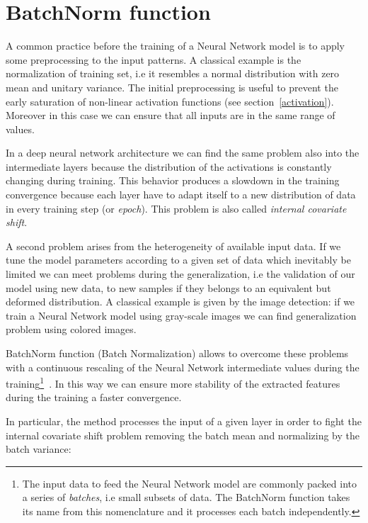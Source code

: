 \documentclass{standalone}
\begin{document}
\section[BatchNorm function]{BatchNorm function}\label{batchnorm}

A common practice before the training of a Neural Network model is to apply some preprocessing to the input patterns.
A classical example is the normalization of training set, i.e it resembles a normal distribution with zero mean and unitary variance.
The initial preprocessing is useful to prevent the early saturation of non-linear activation functions (see section~\ref{activation}).
Moreover in this case we can ensure that all inputs are in the same range of values.

In a deep neural network architecture we can find the same problem also into the intermediate layers because the distribution of the activations is constantly changing during training.
This behavior produces a slowdown in the training convergence because each layer have to adapt itself to a new distribution of data in every training step (or \emph{epoch}).
This problem is also called \emph{internal covariate shift}.

A second problem arises from the heterogeneity of available input data.
If we tune the model parameters according to a given set of data which inevitably be limited we can meet problems during the generalization, i.e the validation of our model using new data, to new samples if they belongs to an equivalent but deformed distribution.
A classical example is given by the image detection: if we train a Neural Network model using gray-scale images we can find generalization problem using colored images.

BatchNorm function (Batch Normalization) allows to overcome these problems with a continuous rescaling of the Neural Network intermediate values during the training\footnote{
  The input data to feed the Neural Network model are commonly packed into a series of \emph{batches}, i.e small subsets of data.
  The BatchNorm function takes its name from this nomenclature and it processes each batch independently.
}~\cite{Sergey2015BatchNorm}.
In this way we can ensure more stability of the extracted features~\cite{Lecun2000EffBackProp} during the training a faster convergence.

In particular, the method processes the input of a given layer in order to fight the internal covariate shift problem removing the batch mean and normalizing by the batch variance:
\end{document}

